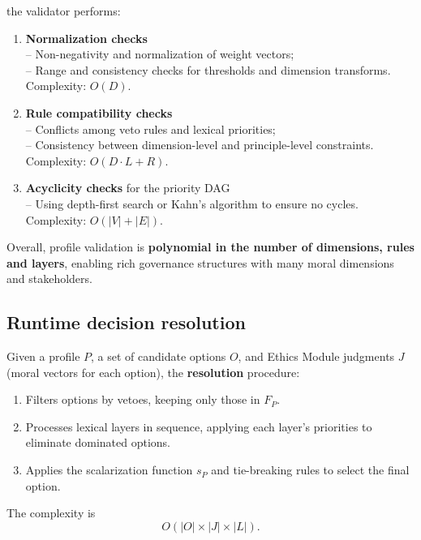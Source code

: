 \documentclass[11pt]{article}
\begin{document}
\noindent the validator performs:

\begin{enumerate}
  \item \textbf{Normalization checks}\\
  -- Non-negativity and normalization of weight vectors;\\
  -- Range and consistency checks for thresholds and dimension transforms.\\
  Complexity: $O(D)$.

  \item \textbf{Rule compatibility checks}\\
  -- Conflicts among veto rules and lexical priorities;\\
  -- Consistency between dimension-level and principle-level constraints.\\
  Complexity: $O(D \cdot L + R)$.

  \item \textbf{Acyclicity checks} for the priority DAG\\
  -- Using depth-first search or Kahn's algorithm to ensure no cycles.\\
  Complexity: $O(|V| + |E|)$.
\end{enumerate}

Overall, profile validation is \textbf{polynomial in the number of dimensions, rules and layers}, enabling rich governance structures with many moral dimensions and stakeholders.

\subsection{Runtime decision resolution}

Given a profile $P$, a set of candidate options $O$, and Ethics Module judgments $J$ (moral vectors for each option), the \textbf{resolution} procedure:

\begin{enumerate}
  \item Filters options by vetoes, keeping only those in $F_P$.
  \item Processes lexical layers in sequence, applying each layer's priorities to eliminate dominated options.
  \item Applies the scalarization function $s_P$ and tie-breaking rules to select the final option.
\end{enumerate}

The complexity is
\[
  O(|O| \times |J| \times |L|).
\]
\end{document}
